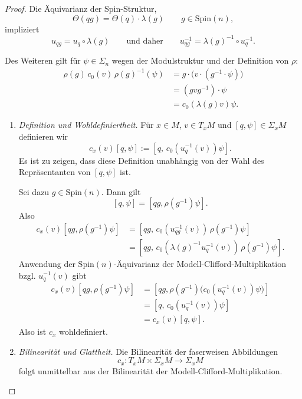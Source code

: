 \documentclass[10pt, letterpaper]{article}
\newcommand{\Spin}{\mathrm{Spin}}
\begin{document}
\begin{proof}
Die Äquivarianz der Spin-Struktur,
\[
\Theta(qg)=\Theta(q)\cdot \lambda(g)
\qquad g\in \Spin(n),
\]
impliziert
\[
u_{qg}=u_q\circ \lambda(g)
\qquad\text{und daher}\qquad
u_{qg}^{-1}=\lambda(g)^{-1}\circ u_q^{-1}.
\]

Des Weiteren gilt für $\psi\in \Sigma_n$ wegen der Modulstruktur und der Definition von $\rho$:
\[
\begin{aligned}
\rho(g)\,c_0(v)\,\rho(g)^{-1}(\psi)
&=
g\cdot \bigl(v\cdot (g^{-1}\cdot \psi)\bigr) \\
&=
(gvg^{-1})\cdot \psi \\
&=
c_0(\lambda(g)v)\psi.
\end{aligned}
\]

\begin{enumerate}
    \item \emph{Definition und Wohldefiniertheit.}
    Für $x\in M$, $v\in T_xM$ und $[q,\psi]\in \Sigma_xM$ definieren wir
    \[
    c_x(v)[q,\psi]
    :=
    [q,\,c_0(u_q^{-1}(v))\psi].
    \]
    Es ist zu zeigen, dass diese Definition unabhängig von der Wahl des Repräsentanten
    von $[q,\psi]$ ist.

    Sei dazu $g\in \Spin(n)$. Dann gilt
    \[
    [q,\psi]=[qg,\rho(g^{-1})\psi].
    \]
    Also
    \[
    \begin{aligned}
    c_x(v)[qg,\rho(g^{-1})\psi]
    &=
    [qg,\,c_0(u_{qg}^{-1}(v))\,\rho(g^{-1})\psi] \\
    &=
    [qg,\,c_0(\lambda(g)^{-1}u_q^{-1}(v))\,\rho(g^{-1})\psi].
    \end{aligned}
    \]
    Anwendung der $\Spin(n)$-Äquivarianz der Modell-Clifford-Multiplikation bzgl. $u_q^{-1}(v)$ gibt
    \[
    \begin{aligned}
    c_x(v)[qg,\rho(g^{-1})\psi]
    &=
    [qg,\rho(g^{-1})\bigl(c_0(u_q^{-1}(v))\psi\bigr)] \\
    &=
    [q,\,c_0(u_q^{-1}(v))\psi] \\
    &=
    c_x(v)[q,\psi].
    \end{aligned}
    \]
    Also ist $c_x$ wohldefiniert.

    \item \emph{Bilinearität und Glattheit.}
    Die Bilinearität der faserweisen Abbildungen
    \[
    c_x:T_xM\times \Sigma_xM\to \Sigma_xM
    \]
    folgt unmittelbar aus der Bilinearität der Modell-Clifford-Multiplikation.


\end{enumerate}
\end{proof}
\end{document}
